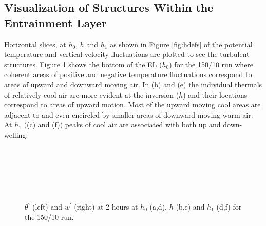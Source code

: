 \clearpage

\subsection{Visualization of Structures Within the Entrainment Layer}
\FloatBarrier

Horizontal slices, at $h_{0}$, $h$ and $h_{1}$ as shown in Figure \ref{fig:hdefs} of the potential temperature 
and vertical velocity fluctuations are plotted to see the turbulent structures.  Figure \ref{fig:conts} shows the bottom of the \acs{EL} ($h_{0}$) for the 150/10 run where coherent areas of positive and negative temperature fluctuations 
correspond to areas of upward and downward moving air.  In (b) and (e) the individual thermals of relatively cool air are more evident at the inversion ($h$) and their locations correspond to areas of upward motion.  Most of the upward moving cool areas are adjacent to and even 
encircled by smaller areas of downward moving warm air.  At $h_{1}$ ((c) and (f)) peaks of cool air are associated 
with both up and down-welling.\\  

\begin{figure}[htbp]
\caption[2D horizontal slices of $\theta^{'}$ and $w^{'}$]{$\theta^{'}$ (left) and $w^{'}$ (right) at 2 hours at $h_{0}$ (a,d), $h$ (b,e) and $h_{1}$ (d,f) for the 150/10 run.} 
\begin{minipage}[b]{0.5\linewidth}  
        \\
        \\ 
 \end{minipage}             
\quad
\begin{minipage}[b]{0.5\linewidth}
        \\
       
       \\
        
\end{minipage}        
        \label{fig:conts}
\end{figure}

